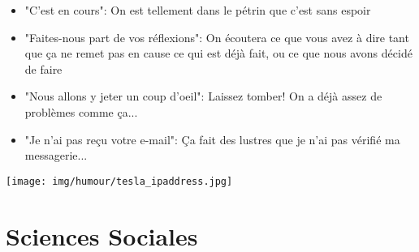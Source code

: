\begin{itemize}
	\item "C'est en cours": On est tellement dans le pétrin que c'est sans espoir

	\item "Faites-nous part de vos réflexions": On écoutera ce que vous avez à dire tant que ça ne remet pas en cause ce qui est déjà fait, ou ce que nous avons décidé de faire

	\item "Nous allons y jeter un coup d'oeil": Laissez tomber! On a déjà assez de problèmes comme ça...

	\item "Je n'ai pas reçu votre e-mail": Ça fait des lustres que je n'ai pas vérifié ma messagerie...
\end{itemize}

\begin{center}\underline{\hspace{5 cm}}\end{center}	

	\begin{center}
	\texttt{[image: img/humour/tesla\_ipaddress.jpg]}
	\end{center}

	\pagebreak
	\section{Sciences Sociales}
	
